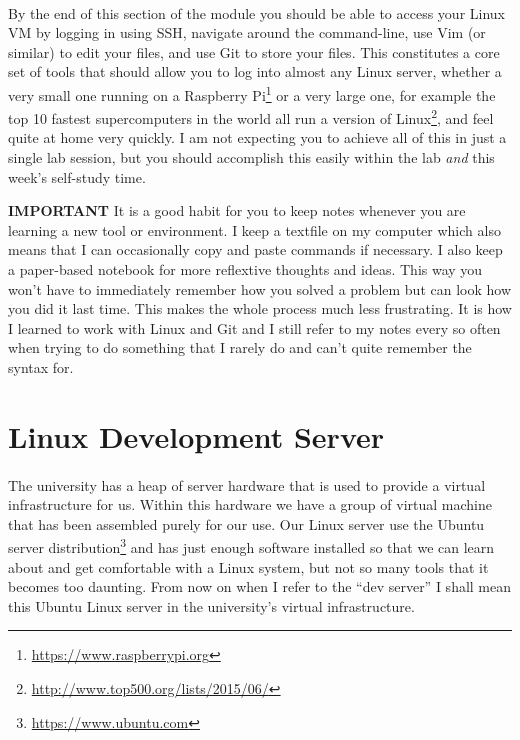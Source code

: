 \documentclass[12pt, a4paper, oneside]{book}
\begin{document}
\paragraph{} By the end of this section of the module you should be able to access your Linux VM by logging in using SSH, navigate around the command-line, use Vim (or similar) to edit your files, and use Git to store your files. This constitutes a core set of tools that should allow you to log into almost any Linux server, whether a very small one running on a Raspberry Pi\footnote{\url{https://www.raspberrypi.org}} or a very large one, for example the top 10 fastest supercomputers in the world all run a version of Linux\footnote{\url{http://www.top500.org/lists/2015/06/}}, and feel quite at home very quickly. I am not expecting you to achieve all of this in just a single lab session, but you should accomplish this easily within the lab \emph{and} this week's self-study time.

\begin{framed}
\textbf{IMPORTANT} It is a good habit for you to keep notes whenever you are learning a new tool or environment. I keep a textfile on my computer which also means that I can occasionally copy and paste commands if necessary. I also keep a paper-based notebook for more reflextive thoughts and ideas. This way you won't have to immediately remember how you solved a problem but can look how you did it last time. This makes the whole process much less frustrating. It is how I learned to work with Linux and Git and I still refer to my notes every so often when trying to do something that I rarely do and can't quite remember the syntax for.
\end{framed}


\section{Linux Development Server}
\label{linux}
\paragraph{} The university has a heap of server hardware that is used to provide a virtual infrastructure for us. Within this hardware we have a group of virtual machine that has been assembled purely for our use. Our Linux server use the Ubuntu server distribution\footnote{\url{https://www.ubuntu.com}} and has just enough software installed so that we can learn about and get comfortable with a Linux system, but not so many tools that it becomes too daunting. From now on when I refer to the ``dev server'' I shall mean this Ubuntu Linux server in the university's virtual infrastructure.
\end{document}
